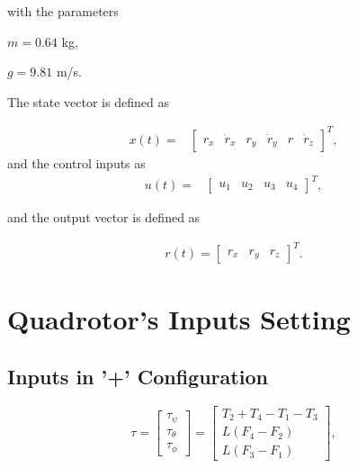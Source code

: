 with the parameters  

$m=0.64 $ kg, 

$g=9.81$ m/s.


The state vector is defined as

\begin{align*}
x(t)=&
\begin{bmatrix}
r_x & \dot{r}_x & r_y & \dot{r}_y & r &\dot{r}_z 
\end{bmatrix}^T,
\end{align*}
and the control inputs as
\begin{align*}
u(t)=&
\begin{bmatrix}
u_1 & u_2 &u_3 & u_4
\end{bmatrix}^T,
\end{align*}

and the output vector is defined as

\begin{align*}
r(t)=
\begin{bmatrix}
r_{x} & r_{y} & r_{z}
\end{bmatrix}^T.
\end{align*}

\section{Quadrotor's Inputs Setting}
\label{sec:inputsetting}


\subsection{Inputs in '+' Configuration}
\begin{equation}
	\tau = \begin{bmatrix}
	\tau_{\psi}\\[5pt]
	\tau_{\theta}\\[5pt]
	\tau_{\phi}
	\end{bmatrix} = \begin{bmatrix}
								T_{2} + T_{4} - T_{1} - T_{3}\\[5pt]
								L(F_{4}-F_{2})\\[5pt]
								L(F_{3}-F_{1})
							\end{bmatrix},
	\label{ec:torques2}						
\end{equation}
